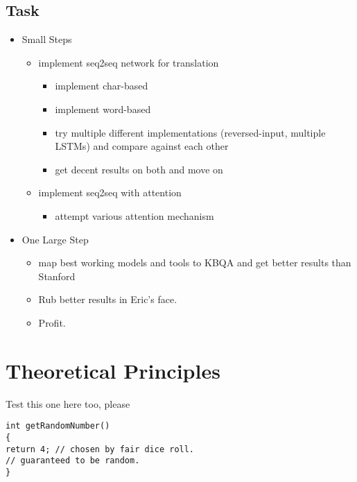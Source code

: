 \documentclass[10pt,a4paper,titlepage,twoside,english]{zhawreprt}
\begin{document}
\section{Task}\label{sec:Task}
\begin{itemize}
	\item Small Steps
	\begin{itemize}
		\item implement seq2seq network for translation
		\begin{itemize}
			\item implement char-based
			\item implement word-based
			\item try multiple different implementations (reversed-input, multiple LSTMs) and compare against each other
			\item get decent results on both and move on
		\end{itemize}
		\item implement seq2seq with attention
		\begin{itemize}
			\item attempt various attention mechanism
		\end{itemize}
	\end{itemize}
	\item One Large Step
	\begin{itemize}
		\item map best working models and tools to KBQA and get better results than Stanford
		\item Rub better results in Eric's face.
		\item Profit.
	\end{itemize}
\end{itemize}

\chapter{Theoretical Principles}\label{chp:TheoreticalPrinciples}
Test this one here too, please
\setlistingCSharp
\begin{lstlisting}[linebackgroundcolor={\inlist{lstnumber}{3,4}}]
int getRandomNumber()
{
return 4; // chosen by fair dice roll.
// guaranteed to be random.
}
\end{lstlisting}
\end{document}
